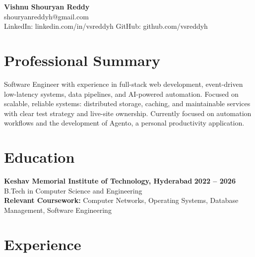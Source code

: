 \documentclass[a4paper,11pt]{article}
\newcommand{\resumeSubheading}[4]{%
  \textbf{#1} \hfill \textbf{#2} \\
{#3} \hfill {#4}
}
\begin{document}
\pagestyle{empty}
\raggedbottom
\addtolength{\textheight}{2\baselineskip}
\small

\begin{center}
  {\LARGE \textbf{Vishnu Shouryan Reddy}}\\[0.3em]
  shouryanreddyh@gmail.com \\[0.3em]
  LinkedIn: linkedin.com/in/vsreddyh \textbar{} GitHub: github.com/vsreddyh
\end{center}
\vspace{-0.8em}

\section*{Professional Summary}

Software Engineer with experience in full-stack web development, event-driven low-latency systems, data pipelines, and AI-powered automation. Focused on scalable, reliable systems: distributed storage, caching, and maintainable services with clear test strategy and live-site ownership. Currently focused on automation workflows and the development of Agento, a personal productivity application.

\section*{Education}

\resumeSubheading
{Keshav Memorial Institute of Technology, Hyderabad}{2022 -- 2026}
{B.Tech in Computer Science and Engineering}{} \\
\textbf{Relevant Coursework:} Computer Networks, Operating Systems, Database Management, Software Engineering


\section*{Experience}
\end{document}
